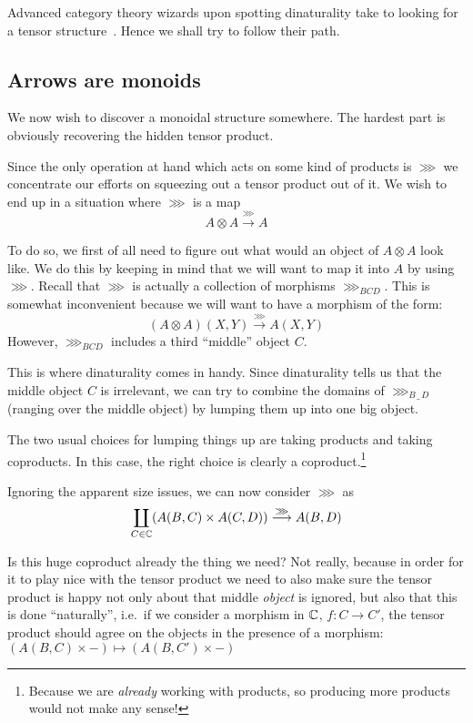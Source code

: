 Advanced category theory wizards upon spotting dinaturality take to looking
for a tensor structure~\cite[p.~8]{arr-like-mon}. Hence we shall try to
follow their path.

\subsection{Arrows are monoids}

We now wish to discover a monoidal structure somewhere. The hardest part is
obviously recovering the hidden tensor product.

Since the only operation at hand which acts on some kind of products is $\ggg$
we concentrate our efforts on squeezing out a tensor product out of it. We wish
to end up in a situation where $\ggg$ is a map
    \[ A \otimes A \overset{\ggg}{\longrightarrow} A \]

To do so, we first of all need to figure out what would an object of $A \otimes A$
look like. We do this by keeping in mind that we will want to map it into $A$
by using $\ggg$. Recall that $\ggg$ is actually a collection of morphisms
$\ggg_{BCD}$. This is somewhat inconvenient because we will want to have a
morphism of the form:
    \[ (A \otimes A)(X, Y) \overset{\ggg}{\longrightarrow} A(X, Y) \]
However, $\ggg_{BCD}$ includes a third ``middle'' object $C$.

This is where dinaturality comes in handy. Since dinaturality tells us that the
middle object $C$ is irrelevant, we can try to combine the domains of
$\ggg_{B\,\_ \,D}$ (ranging over the middle object) by lumping them up into one big
object.

The two usual choices for lumping things up are taking products and taking
coproducts. In this case, the right choice is clearly a
coproduct.\footnote{Because we are \emph{already} working with products, so
producing more products would not make any sense!}

Ignoring the apparent size issues, we can now consider $\ggg$ as
\[ \coprod_{C \in \mathbb{C}} (A(B, C) \times A(C, D))
    \overset{\ggg}{\longrightarrow} A(B, D) \]

Is this huge coproduct already the thing we need? Not really, because in order
for it to play nice with the tensor product we need to also make sure the tensor
product is happy not only about that middle \emph{object} is ignored, but
also that this is done ``naturally'', i.e.~if we consider a morphism in
$\mathbb{C}$, $f: C \to C'$, the tensor product should agree on the objects in the
presence of a morphism:
$\left( A(B, C) \times -\right) \mapsto
    \left( A(B, C') \times - \right)$

